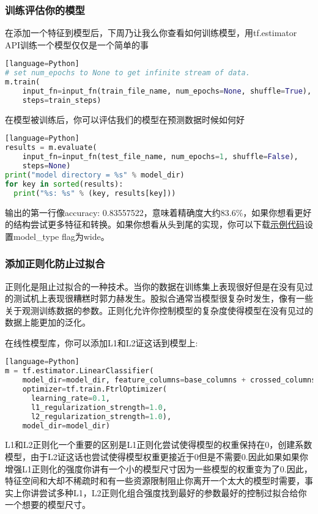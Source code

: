 \subsubsection{训练评估你的模型}
在添加一个特征到模型后，下周乃让我么你查看如何训练模型，用tf.estimator API训练一个模型仅仅是一个简单的事
\begin{lstlisting}[language=Python][language=Python]
# set num_epochs to None to get infinite stream of data.
m.train(
    input_fn=input_fn(train_file_name, num_epochs=None, shuffle=True),
    steps=train_steps)
\end{lstlisting}
在模型被训练后，你可以评估我们的模型在预测数据时候如何好
\begin{lstlisting}[language=Python][language=Python]
results = m.evaluate(
    input_fn=input_fn(test_file_name, num_epochs=1, shuffle=False),
    steps=None)
print("model directory = %s" % model_dir)
for key in sorted(results):
  print("%s: %s" % (key, results[key]))
\end{lstlisting}
输出的第一行像accuracy: 0.83557522，意味着精确度大约83.6\%，如果你想看更好的结构尝试更多特征和转换。如果你想看从头到尾的实现，你可以下载\href{https://www.github.com/tensorflow/tensorflow/blob/r1.3/tensorflow/examples/learn/wide_n_deep_tutorial.py}{示例代码}设置model\_type flag为wide。
\subsubsection{添加正则化防止过拟合}
正则化是阻止过拟合的一种技术。当你的数据在训练集上表现很好但是在没有见过的测试机上表现很糟糕时郭力赫发生。股拟合通常当模型很复杂时发生，像有一些关于观测训练数据的参数。正则化允许你控制模型的复杂度使得模型在没有见过的数据上能更加的泛化。

在线性模型库，你可以添加L1和L2证这话到模型上:
\begin{lstlisting}[language=Python][language=Python]
m = tf.estimator.LinearClassifier(
    model_dir=model_dir, feature_columns=base_columns + crossed_columns,
    optimizer=tf.train.FtrlOptimizer(
      learning_rate=0.1,
      l1_regularization_strength=1.0,
      l2_regularization_strength=1.0),
    model_dir=model_dir)
\end{lstlisting}
L1和L2正则化一个重要的区别是L1正则化尝试使得模型的权重保持在0，创建系数模型，由于L2证这话也尝试使得模型权重更接近于0但是不需要0.因此如果如果你增强L1正则化的强度你讲有一个小的模型尺寸因为一些模型的权重变为了0.因此，特征空间和大却不稀疏时和有一些资源限制阻止你离开一个太大的模型时需要，事实上你讲尝试多种L1，L2正则化组合强度找到最好的参数最好的控制过拟合给你一个想要的模型尺寸。
